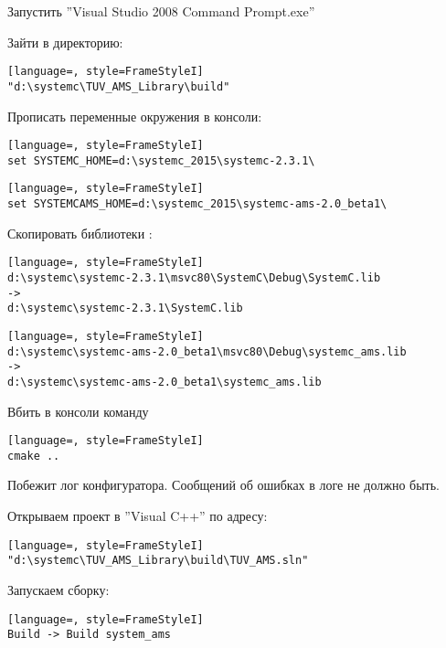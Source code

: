 Запустить ''Visual Studio 2008 Command Prompt.exe''

Зайти в директорию:
\begin{lstlisting}[language=, style=FrameStyleI]
"d:\systemc\TUV_AMS_Library\build"
\end{lstlisting}



Прописать переменные окружения в консоли:

\begin{lstlisting}[language=, style=FrameStyleI]
set SYSTEMC_HOME=d:\systemc_2015\systemc-2.3.1\
\end{lstlisting}

\begin{lstlisting}[language=, style=FrameStyleI]
set SYSTEMCAMS_HOME=d:\systemc_2015\systemc-ams-2.0_beta1\
\end{lstlisting}





Скопировать библиотеки :

\begin{lstlisting}[language=, style=FrameStyleI]
d:\systemc\systemc-2.3.1\msvc80\SystemC\Debug\SystemC.lib
->
d:\systemc\systemc-2.3.1\SystemC.lib
\end{lstlisting}

\begin{lstlisting}[language=, style=FrameStyleI]
d:\systemc\systemc-ams-2.0_beta1\msvc80\Debug\systemc_ams.lib
->
d:\systemc\systemc-ams-2.0_beta1\systemc_ams.lib
\end{lstlisting}



Вбить в консоли команду

\begin{lstlisting}[language=, style=FrameStyleI]
cmake ..
\end{lstlisting}

Побежит лог конфигуратора. Сообщений об ошибках в логе не должно быть.




Открываем проект в ''Visual C++'' по адресу:

\begin{lstlisting}[language=, style=FrameStyleI]
"d:\systemc\TUV_AMS_Library\build\TUV_AMS.sln"
\end{lstlisting}

Запускаем сборку:


\begin{lstlisting}[language=, style=FrameStyleI]
Build -> Build system_ams
\end{lstlisting}


